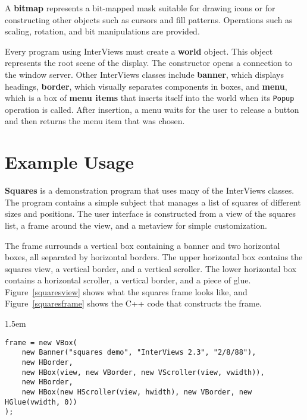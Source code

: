 A {\bf bitmap} represents a bit-mapped mask suitable for drawing icons or
for constructing other objects such as cursors and fill patterns.
Operations such as scaling, rotation, and bit manipulations are provided.

Every program using InterViews must create a {\bf world} object.
This object represents the root scene of the display.
The constructor opens a connection to the window server.
Other InterViews classes include {\bf banner}, which displays headings,
{\bf border}, which visually separates components in boxes, and
{\bf menu}, which is a box of {\bf menu items} that
inserts itself into the world when its {\tt Popup} operation is called.
After insertion, a menu 
waits for the user to release a button and then returns the menu item
that was chosen.

\section{Example Usage}
{\bf Squares} is a demonstration program
that uses many of the InterViews classes.
The program contains a simple subject
that manages a list of squares
of different sizes and positions.
The user interface is constructed from a view of the squares list,
a frame around the view, and a metaview for simple customization.

The frame surrounds a vertical box containing a banner and two horizontal
boxes, all separated by horizontal borders.
The upper horizontal box contains the squares view, a vertical border,
and a vertical scroller.
The lower horizontal box contains a horizontal scroller, a vertical border,
and a piece of glue.
Figure~\ref{squaresview} shows what the squares frame looks like, and
Figure~\ref{squaresframe} shows the C++ code that constructs the frame.

\begin{figure*}
\vspace{2.6in}
\caption{Squares view}
\label{squaresview}
\end{figure*}

\begin{figure*}
\begin{code}{1.5em}
\begin{verbatim}
frame = new VBox(
    new Banner("squares demo", "InterViews 2.3", "2/8/88"),
    new HBorder,
    new HBox(view, new VBorder, new VScroller(view, vwidth)),
    new HBorder,
    new HBox(new HScroller(view, hwidth), new VBorder, new HGlue(vwidth, 0))
);
\end{verbatim}
\end{code}
\caption{Code to construct squares frame}
\label{squaresframe}
\end{figure*}


